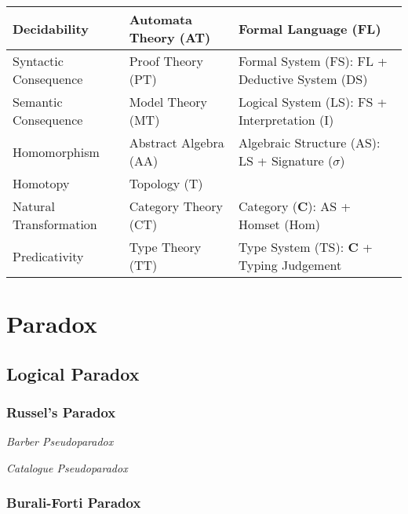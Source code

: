 \begin{tabularx}{\textwidth}{| X | X | X |}
    \hline
    Decidability            & Automata Theory (AT)  & Formal Language (FL) \\
    \hline
    Syntactic Consequence   & Proof Theory (PT)     & Formal System (FS): FL + Deductive System (DS) \\
    \hline
    Semantic Consequence    & Model Theory (MT)     & Logical System (LS): FS + Interpretation (I) \\
    \hline
    Homomorphism            & Abstract Algebra (AA) & Algebraic Structure (AS): LS + Signature ($\sigma$) \\
    \hline
    Homotopy                & Topology (T)          & \\
    \hline
    Natural Transformation  & Category Theory (CT)  & Category ($\mathbf{C}$): AS + Homset (Hom) \\
    \hline
    Predicativity           & Type Theory (TT)      & Type System (TS): $\mathbf{C}$ + Typing Judgement\\
    \hline
\end{tabularx}



\section{Paradox}\label{sec:paradox}

\subsection{Logical Paradox}\label{sec:logical_paradox}
\cite{curry77}

\subsubsection{Russel's Paradox}\label{sec:russels_paradox}

\emph{Barber Pseudoparadox}

\emph{Catalogue Pseudoparadox}



\subsubsection{Burali-Forti Paradox}\label{sec:baruliforti_paradox}


